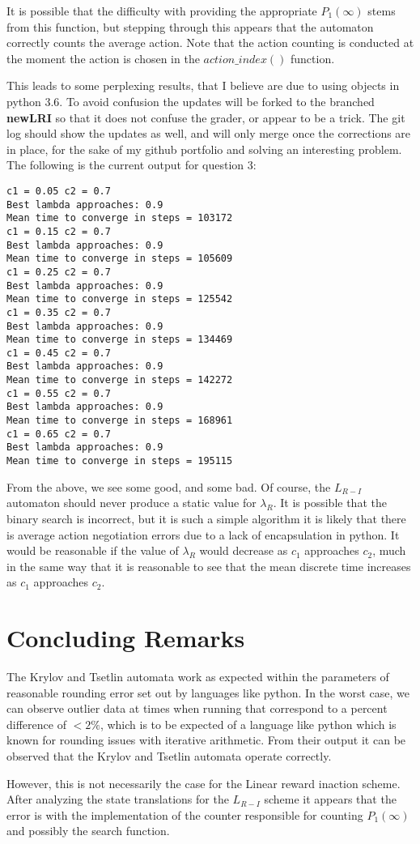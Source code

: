 \documentclass[10pt,english]{article}
\begin{document}
It is possible that the difficulty with providing the appropriate $P_1(\infty)$ stems from this function, but stepping through this appears that the automaton correctly counts the average action.  Note that the action counting is conducted at the moment the action is chosen in the $action\_index()$ function.

This leads to some perplexing results, that I believe are due to using objects in python 3.6.  To avoid confusion the updates will be forked to the branched \textbf{newLRI} so that it does not confuse the grader, or appear to be a trick.  The git log should show the updates as well, and will only merge once the corrections are in place, for the sake of my github portfolio and solving an interesting problem.  The following is the current output for question 3:
\begin{lstlisting}[label={list:first},caption=Testing the $L_{R-I}$  automaton.]
c1 = 0.05 c2 = 0.7
Best lambda approaches: 0.9
Mean time to converge in steps = 103172
c1 = 0.15 c2 = 0.7
Best lambda approaches: 0.9
Mean time to converge in steps = 105609
c1 = 0.25 c2 = 0.7
Best lambda approaches: 0.9
Mean time to converge in steps = 125542
c1 = 0.35 c2 = 0.7
Best lambda approaches: 0.9
Mean time to converge in steps = 134469
c1 = 0.45 c2 = 0.7
Best lambda approaches: 0.9
Mean time to converge in steps = 142272
c1 = 0.55 c2 = 0.7
Best lambda approaches: 0.9
Mean time to converge in steps = 168961
c1 = 0.65 c2 = 0.7
Best lambda approaches: 0.9
Mean time to converge in steps = 195115

\end{lstlisting}
From the above, we see some good, and some bad.  Of course, the $L_{R-I}$ automaton should never produce a static value for $\lambda_R$.  It is possible that the binary search is incorrect, but it is such a simple algorithm it is likely that there is average action negotiation errors due to a lack of encapsulation in python. It would be reasonable if the value of $\lambda_R$ would decrease as $c_1$ approaches $c_2$, much in the same way that it is reasonable to see that the mean discrete time increases as $c_1$ approaches $c_2$.

\section{Concluding Remarks}
    The Krylov and Tsetlin automata work as expected within the parameters of reasonable rounding error set out by languages like python.  In the worst case, we can observe outlier data at times when running that correspond to a percent difference of $< 2\%$, which is to be expected of a language like python which is known for rounding issues with iterative arithmetic.  From their output it can be observed that the Krylov and Tsetlin automata operate correctly.

    However, this is not necessarily the case for the Linear reward inaction scheme.  After analyzing the state translations for the $L_{R-I}$ scheme it appears that the error is with the implementation of the counter responsible for counting $P_1(\infty)$ and possibly the search function.
\end{document}
